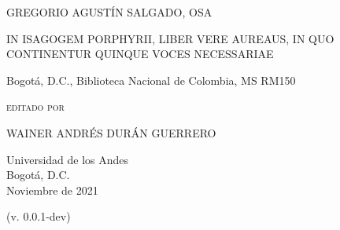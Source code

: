 



  \usepackage{draftwatermark}
  \SetWatermarkFontSize{3.5cm}





\pagestyle{empty}

\begin{center}
\LARGE
\MakeUppercase{Gregorio Agustín Salgado, OSA}

\vfill

\Large
\MakeUppercase{In Isagogem Porphyrii, liber vere aureaus, in quo continentur quinque voces necessariae}

\bigskip

\normalsize
Bogotá, D.C., Biblioteca Nacional de Colombia, MS RM150

\vfill

\small
\textsc{editado por}

\bigskip

\Large

\MakeUppercase{Wainer Andrés Durán Guerrero}

\vfill

\normalsize
Universidad de los Andes \\

Bogotá, D.C. \\

Noviembre de 2021 \\

\scriptsize

(v. 0.0.1-dev)

\end{center}


\cleardoublepage
    
    
\pagestyle{fancy}
\fancyhead{}
\fancyfoot[C]{\thepage}
\renewcommand*{\contentsname}{Index generalis}
\tableofcontents


\fancyhead{}
\fancyfoot[C]{\thepage}

\cleardoublepage


